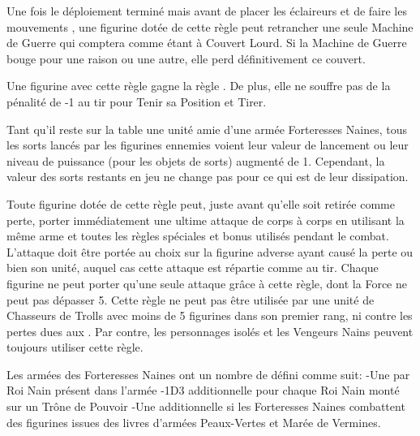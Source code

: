 \armyspecialruleentry{\entrench}

Une fois le déploiement terminé mais avant de placer les éclaireurs et de faire les mouvements \vanguard, une figurine dotée de cette règle peut retrancher une seule Machine de Guerre qui comptera comme étant à Couvert Lourd. Si la Machine de Guerre bouge pour une raison ou une autre, elle perd définitivement ce couvert.

\armyspecialruleentry{\sturdy}

Une figurine avec cette règle gagne la règle \thunderouscharge. De plus, elle ne souffre pas de la pénalité de -1 au tir pour Tenir sa Position et Tirer. 

\armyspecialruleentry{\hewnoutofmountains}

Tant qu'il reste sur la table une unité amie d'une armée Forteresses Naines, tous les sorts lancés par les figurines ennemies voient leur valeur de lancement ou leur niveau de puissance (pour les objets de sorts) augmenté de 1. Cependant, la valeur des sorts restants en jeu ne change pas pour ce qui est de leur dissipation.


\armyspecialruleentry{\comewithme}

Toute figurine dotée de cette règle peut, juste avant qu'elle soit retirée comme perte, porter immédiatement une ultime attaque de corps à corps en utilisant la même arme et toutes les règles spéciales et bonus utilisés pendant le combat. L'attaque doit être portée au choix sur la figurine adverse ayant causé la perte ou bien son unité, auquel cas cette attaque est répartie comme au tir. Chaque figurine ne peut porter qu'une seule attaque grâce à cette règle, dont la Force ne peut pas dépasser 5. Cette règle ne peut pas être utilisée par une unité de Chasseurs de Trolls avec moins de 5 figurines dans son premier rang, ni contre les pertes dues aux \impacthits{}. Par contre, les personnages isolés et les Vengeurs Nains peuvent toujours utiliser cette règle.

\armyspecialruleentry{\ancientgrudge}

Les armées des Forteresses Naines ont un nombre de  défini comme suit:
\newline-Une \ancientgrudge par Roi Nain présent dans l'armée
\newline-1D3 \ancientgrudge additionnelle pour chaque Roi Nain monté sur un Trône de Pouvoir
\newline-Une \ancientgrudge additionnelle si les Forteresses Naines combattent des figurines issues des livres d'armées Peaux-Vertes et Marée de Vermines.


